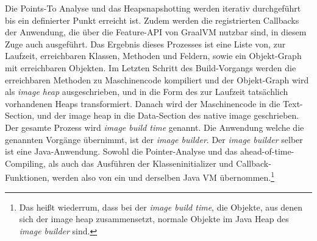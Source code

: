Die Points-To Analyse und das Heapsnapshotting werden iterativ durchgeführt bis ein definierter Punkt erreicht ist. Zudem werden die registrierten Callbacks der Anwendung, 
die über die Feature-API von GraalVM nutzbar sind, in diesem Zuge auch ausgeführt. Das Ergebnis dieses Prozesses ist eine Liste von, zur Laufzeit, erreichbaren Klassen, 
Methoden und Feldern, sowie ein Objekt-Graph mit erreichbaren Objekten. Im Letzten Schritt des Build-Vorgangs werden die erreichbaren Methoden zu Maschinencode kompiliert
 und der Objekt-Graph wird als \textit{image heap} ausgeschrieben, und in die Form des zur Laufzeit tatsächlich vorhandenen Heaps transformiert. Danach wird der Maschinencode 
 in die Text-Section, und der image heap in die Data-Section \parencite[Fig. 1-13]{TISC1995} des native image geschrieben. Der gesamte Prozess wird \textit{image build time} genannt\parencite{Wimmer2019}.
Die Anwendung welche die genannten Vorgänge übernimmt, ist der \textit{image builder}. Der \textit{image builder} selber ist eine Java-Anwendung. Sowohl die Pointer-Analyse 
und das ahead-of-time-Compiling, als auch das Ausführen der Klasseninitializer und Callback-Funktionen, werden also von ein und derselben Java VM
 übernommen.\footnote{Das heißt wiederrum, dass bei der \textit{image build time}, die Objekte, aus denen sich der image heap zusammensetzt,
 normale Objekte im Java Heap des \textit{image builder} sind.}
